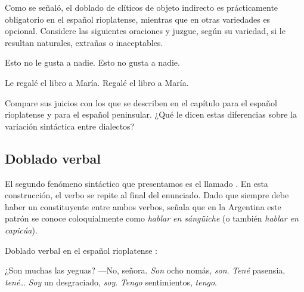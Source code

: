 
\begin{ejercicio}\label{ej:15-juicios}
Como se señaló, el doblado de clíticos de objeto indirecto es prácticamente
obligatorio en el español rioplatense, mientras que en otras variedades es
opcional. Considere las siguientes oraciones y juzgue, según su variedad, si le
resultan naturales, extrañas o inaceptables.

\begin{exe}
  \ex
    \begin{xlist}
      \ex Esto no le gusta a nadie.
      \ex Esto no gusta a nadie.
    \end{xlist}
  \ex
    \begin{xlist}
      \ex Le regalé el libro a María.
      \ex Regalé el libro a María.
    \end{xlist}
\end{exe}

Compare sus juicios con los que se describen en el capítulo para el español
rioplatense y para el español peninsular. ¿Qué le dicen estas diferencias sobre
la variación sintáctica entre dialectos?
\end{ejercicio}

\subsection{Doblado verbal}\label{sec:15-dobladoverbal}

El segundo fenómeno sintáctico que presentamos es el llamado . En esta construcción, el verbo se repite al final del enunciado. Dado
que siempre debe haber un constituyente entre ambos verbos,
\textcite{kany1969} señala que en la Argentina este patrón se conoce
coloquialmente como \textit{hablar en sángüiche} (o también \textit{hablar en
capicúa}).

\begin{exe}
  \ex\label{ex:15-sanguche} Doblado verbal en el español rioplatense
      \parencite[adaptado de][315--316]{kany1969}:
    \begin{xlist}
      \ex ¿Son muchas las yeguas? ---No, señora. \textit{Son} ocho nomás,
          \textit{son}.
      \ex \textit{Tené} pasensia, \textit{tené}\ldots
      \ex \textit{Soy} un desgraciado, \textit{soy}.
      \ex \textit{Tengo} sentimientos, \textit{tengo}.
    \end{xlist}
\end{exe}

